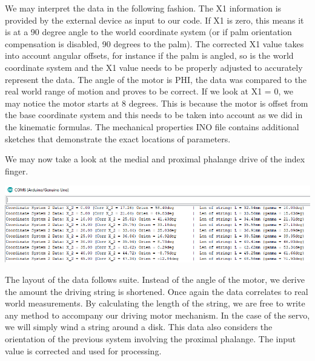\documentclass{article}
\begin{document}
We may interpret the data in the following fashion. The X1 information is provided by the external device as input to our code. If X1 is zero, this means it is at a 90 degree angle to the world coordinate system (or if palm orientation compensation is disabled, 90 degrees to the palm). The corrected X1 value takes into account angular offsets, for instance if the palm is angled, so is the world coordinate system and the X1 value needs to be properly adjusted to accurately represent the data. The angle of the motor is PHI, the data was compared to the real world range of motion and proves to be correct. If we look at X1 = 0, we may notice the motor starts at 8 degrees. This is because the motor is offset from the base coordinate system and this needs to be taken into account as we did in the kinematic formulas. The mechanical properties INO file contains additional sketches that demonstrate the exact locations of parameters.

We may now take a look at the medial and proximal phalange drive of the index finger.

\begin{center}
\includegraphics[width=\textwidth]{IMG/IK_03.png}
\end{center}

The layout of the data follows suite. Instead of the angle of the motor, we derive the amount the driving string is shortened. Once again the data correlates to real world measurements. By calculating the length of the string, we are free to write any method to accompany our driving motor mechanism. In the case of the servo, we will simply wind a string around a disk. This data also considers the orientation of the previous system involving the proximal phalange. The input value is corrected and used for processing. 
\end{document}
